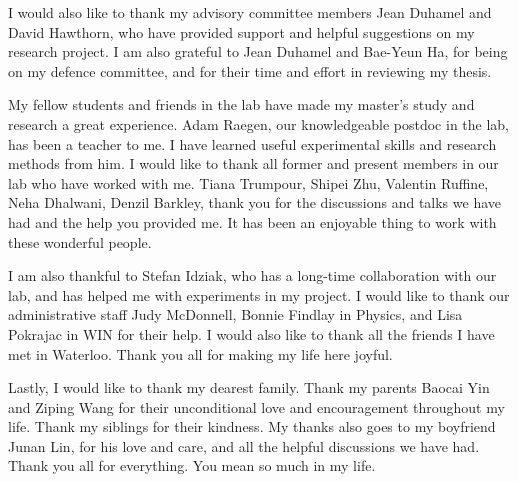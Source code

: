 I would also like to thank my advisory committee members Jean Duhamel and David Hawthorn, who have provided support and helpful suggestions on my research project. I am also grateful to Jean Duhamel and Bae-Yeun Ha, for being on my defence committee, and for their time and effort in reviewing my thesis.

My fellow students and friends in the lab have made my master's study and research a great experience. Adam Raegen, our knowledgeable postdoc in the lab, has been a teacher to me. I have learned useful experimental skills and research methods from him. I would like to thank all former and present members in our lab who have worked with me. Tiana Trumpour, Shipei Zhu, Valentin Ruffine, Neha Dhalwani, Denzil Barkley, thank you for the discussions and talks we have had and the help you provided me. It has been an enjoyable thing to work with these wonderful people.

I am also thankful to Stefan Idziak, who has a long-time collaboration with our lab, and has helped me with experiments in my project. I would like to thank our administrative staff Judy McDonnell, Bonnie Findlay in Physics, and Lisa Pokrajac in WIN for their help. I would also like to thank all the friends I have met in Waterloo. Thank you all for making my life here joyful.

Lastly, I would like to thank my dearest family. Thank my parents Baocai Yin and Ziping Wang for their unconditional love and encouragement throughout my life. Thank my siblings for their kindness. My thanks also goes to my boyfriend Junan Lin, for his love and care, and all the helpful discussions we have had. Thank you all for everything. You mean so much in my life.

\cleardoublepage



\renewcommand\contentsname{Table of Contents}
\tableofcontents
\cleardoublepage
{}


\listoffigures
\cleardoublepage
{}		%



